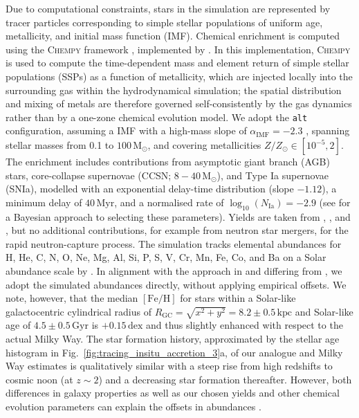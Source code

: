 \documentclass[fleqn,usenatbib]{mnras}
\newcommand{\changed}[1]{{{#1}}}
\begin{document}
Due to computational constraints, stars in the simulation are represented by tracer particles corresponding to simple stellar populations of uniform age, metallicity, and initial mass function (IMF). Chemical enrichment is computed using the \textsc{Chempy} framework \citep{Rybizki2017}, implemented by \citet{Buck2021}. \changed{In this implementation, \textsc{Chempy} is used to compute the time-dependent mass and element return of simple stellar populations (SSPs) as a function of metallicity, which are injected locally into the surrounding gas within the hydrodynamical simulation; the spatial distribution and mixing of metals are therefore governed self-consistently by the gas dynamics rather than by a one-zone chemical evolution model.} We adopt the \texttt{alt} configuration, assuming a \citet{Chabrier2003} IMF with a high-mass slope of $\alpha_\text{IMF} = -2.3$ , spanning stellar masses from 0.1 to $100\,\mathrm{M_\odot}$, and covering metallicities $Z/Z_\odot \in [10^{-5},2]$. The enrichment includes contributions from asymptotic giant branch (AGB) stars, core-collapse supernovae (CCSN; $8 - 40\,\mathrm{M_\odot}$), and Type Ia supernovae (SNIa), modelled with an exponential delay-time distribution (slope $-1.12$), a minimum delay of $40\,\mathrm{Myr}$, and a normalised rate of $\changed{\log_{10}}(N_\mathrm{Ia}) = -2.9$ (see \citealt{Buck2025,Guenes2025} for a Bayesian approach to selecting these parameters). Yields are taken from \citet[][CCSN]{Chieffi2004}, \citet[][SNIa]{Seitenzahl2013}, and \citet[][AGB; \texttt{new\_fid} yields in \citealt{Buck2021}]{Karakas2016}, but no additional contributions, for example from neutron star mergers, for the rapid neutron-capture process. The simulation tracks elemental abundances for H, He, C, N, O, Ne, Mg, Al, Si, P, S, V, Cr, Mn, Fe, Co, and Ba on a Solar abundance scale by \citet{Asplund2009}. In alignment with the approach in \citet{Buder2025} and differing from \citet{Buder2024}, we adopt the simulated abundances directly, without applying empirical offsets. We note, however, that the median $\mathrm{[Fe/H]}$ for stars within a Solar-like galactocentric cylindrical radius of $R_\mathrm{GC} = \sqrt{x^2+y^2} = 8.2 \pm 0.5\,\mathrm{kpc}$ \citep{BlandHawthorn_Gerhard2016} and Solar-like age of $4.5 \pm 0.5\,\mathrm{Gyr}$ \citep{Soderblom2010} is $+0.15\,\mathrm{dex}$ and thus slightly enhanced with respect to the actual Milky Way. The star formation history, approximated by the stellar age histogram in Fig.~\ref{fig:tracing_insitu_accretion_3}a, of our analogue and Milky Way estimates \citep{Snaith2015} is qualitatively similar with a steep rise from high redshifts to cosmic noon (at $z\sim2$) and a decreasing star formation thereafter. However, both differences in galaxy properties as well as our chosen yields and other chemical evolution parameters can explain the offsets in abundances \citep[see also][]{Buck2021}.
\end{document}

